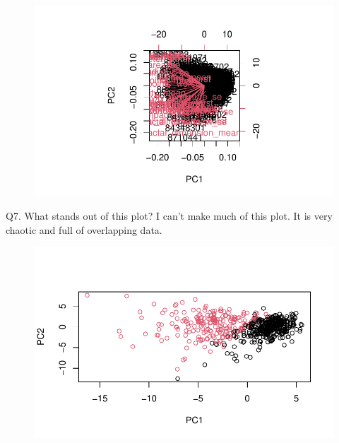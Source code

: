 \documentclass[
  letterpaper,
  DIV=11,
  numbers=noendperiod]{scrartcl}
\newenvironment{Shaded}{\begin{snugshade}}{\end{snugshade}}
\newcommand{\AttributeTok}[1]{\textcolor[rgb]{0.40,0.45,0.13}{#1}}
\newcommand{\CommentTok}[1]{\textcolor[rgb]{0.37,0.37,0.37}{#1}}
\newcommand{\DecValTok}[1]{\textcolor[rgb]{0.68,0.00,0.00}{#1}}
\newcommand{\FunctionTok}[1]{\textcolor[rgb]{0.28,0.35,0.67}{#1}}
\newcommand{\NormalTok}[1]{\textcolor[rgb]{0.00,0.23,0.31}{#1}}
\newcommand{\SpecialCharTok}[1]{\textcolor[rgb]{0.37,0.37,0.37}{#1}}
\newcommand{\StringTok}[1]{\textcolor[rgb]{0.13,0.47,0.30}{#1}}
\begin{document}
\begin{figure}[H]

{\centering \includegraphics{test_files/figure-pdf/unnamed-chunk-7-1.pdf}

}

\end{figure}

Q7. What stands out of this plot? I can't make much of this plot. It is
very chaotic and full of overlapping data.

\begin{Shaded}
\end{Shaded}

\begin{figure}[H]

{\centering \includegraphics{test_files/figure-pdf/unnamed-chunk-8-1.pdf}

}

\end{figure}
\end{document}
